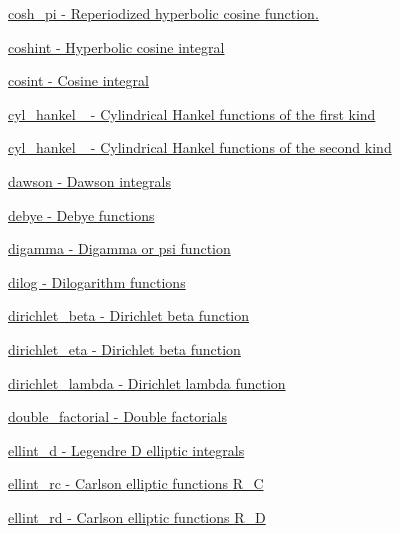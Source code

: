 \begin{DoxyItemize}
\item \hyperlink{group__gnu__math__spec__func_gaf59c68a01adfdab0f22c4fb405ab2a36}{cosh\+\_\+pi -\/ Reperiodized hyperbolic cosine function.}
\item \hyperlink{group__gnu__math__spec__func_ga2411d513d418180285ace6650c7b7e31}{coshint -\/ Hyperbolic cosine integral}
\item \hyperlink{group__gnu__math__spec__func_gafd398869cde057087e6b3428a1d13a93}{cosint -\/ Cosine integral}
\item \hyperlink{group__gnu__math__spec__func_ga5329bba77d10a9d2f15d9bbe43a70db3}{cyl\+\_\+hankel\+\_ -\/ Cylindrical Hankel functions of the first kind}
\item \hyperlink{group__gnu__math__spec__func_ga7ebc71dd48ac97255d72f5f5f43dfd8e}{cyl\+\_\+hankel\+\_ -\/ Cylindrical Hankel functions of the second kind}
\item \hyperlink{group__gnu__math__spec__func_gabc97cbc04fdd23593e8dccbc1421dad5}{dawson -\/ Dawson integrals}
\item \hyperlink{group__gnu__math__spec__func_ga0b14de47c011de3ebf771c9f29b2b78c}{debye -\/ Debye functions}
\item \hyperlink{group__gnu__math__spec__func_ga7b87300edf8754d959e1d94fe0c9246e}{digamma -\/ Digamma or psi function}
\item \hyperlink{group__gnu__math__spec__func_ga4185ee1a0f9189a18085f65d52b6bc9b}{dilog -\/ Dilogarithm functions}
\item \hyperlink{group__gnu__math__spec__func_ga87466a2d429a2815d794acc21c882b08}{dirichlet\+\_\+beta -\/ Dirichlet beta function}
\item \hyperlink{group__gnu__math__spec__func_gae46e26e4107675d285c79a2d6202e6c7}{dirichlet\+\_\+eta -\/ Dirichlet beta function}
\item \hyperlink{group__gnu__math__spec__func_ga06842a81bdcabf9c62252dde992d42ee}{dirichlet\+\_\+lambda -\/ Dirichlet lambda function}
\item \hyperlink{group__gnu__math__spec__func_ga1e62c47f84f9782828f8830b4fedc13c}{double\+\_\+factorial -\/ Double factorials}
\item \hyperlink{group__gnu__math__spec__func_gad75103894786e6d7766bac4d8447b6cc}{ellint\+\_\+d -\/ Legendre D elliptic integrals}
\item \hyperlink{group__gnu__math__spec__func_ga7d3d42f5f71a74266be8aaca528056bf}{ellint\+\_\+rc -\/ Carlson elliptic functions R\+\_\+C}
\item \hyperlink{group__gnu__math__spec__func_gad29dae6abc783c8fe952dba477e65309}{ellint\+\_\+rd -\/ Carlson elliptic functions R\+\_\+D}

\end{DoxyItemize}
